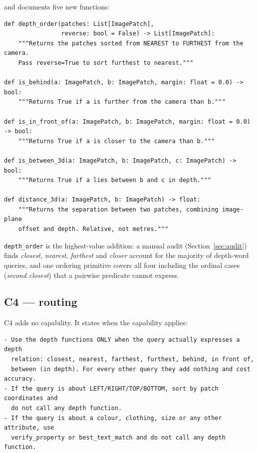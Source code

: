 \documentclass[12pt,a4paper,oneside]{report}
\begin{document}
and documents five new functions:

\begin{lstlisting}[caption={Signatures presented to the generator in C3 and C4.}]
def depth_order(patches: List[ImagePatch],
                reverse: bool = False) -> List[ImagePatch]:
    """Returns the patches sorted from NEAREST to FURTHEST from the camera.
    Pass reverse=True to sort furthest to nearest."""

def is_behind(a: ImagePatch, b: ImagePatch, margin: float = 0.0) -> bool:
    """Returns True if a is further from the camera than b."""

def is_in_front_of(a: ImagePatch, b: ImagePatch, margin: float = 0.0) -> bool:
    """Returns True if a is closer to the camera than b."""

def is_between_3d(a: ImagePatch, b: ImagePatch, c: ImagePatch) -> bool:
    """Returns True if a lies between b and c in depth."""

def distance_3d(a: ImagePatch, b: ImagePatch) -> float:
    """Returns the separation between two patches, combining image-plane
    offset and depth. Relative, not metres."""
\end{lstlisting}

\texttt{depth\_order} is the highest-value addition: a manual audit
(Section~\ref{sec:audit}) finds \emph{closest}, \emph{nearest}, \emph{farthest} and
\emph{closer} account for the majority of depth-word queries, and one ordering
primitive covers all four including the ordinal cases (\emph{second closest}) that a
pairwise predicate cannot express.

\subsection{C4 --- routing}

C4 adds no capability. It states when the capability applies:

\begin{lstlisting}[style=plainlist]
- Use the depth functions ONLY when the query actually expresses a depth
  relation: closest, nearest, farthest, furthest, behind, in front of,
  between (in depth). For every other query they add nothing and cost accuracy.
- If the query is about LEFT/RIGHT/TOP/BOTTOM, sort by patch coordinates and
  do not call any depth function.
- If the query is about a colour, clothing, size or any other attribute, use
  verify_property or best_text_match and do not call any depth function.
\end{lstlisting}
\end{document}
